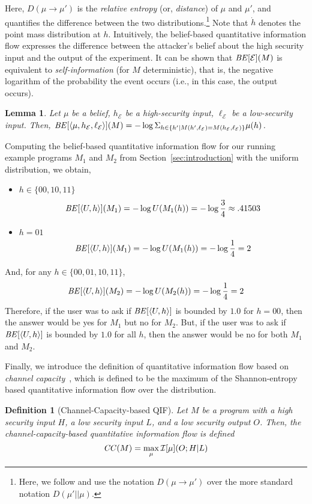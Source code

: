 \documentclass{llncs}
\newtheorem{definition}[theorem]{Definition}
\newtheorem{lemma}[theorem]{Lemma}
\newcommand{\aset}[1]{\{{#1}\}}
\newcommand{\aseq}[1]{\langle#1\rangle}
\begin{document}
Here, $D(\mu \rightarrow \mu')$ is the {\em relative entropy}
  (or, {\em distance}) of $\mu$ and $\mu'$, and quantifies the
difference between the two distributions.\footnote{Here, we
    follow \cite{clarkson:csf2005} and use the notation
    $D(\mu\rightarrow \mu')$ over the more standard notation $D(\mu'
    || \mu)$.}  Note that $\dot{h}$ denotes the point mass
distribution at $h$.  Intuitively, the belief-based quantitative
information flow expresses the difference between the attacker's
belief about the high security input and the output of the experiment.
It can be shown that ${\it BE}[\mathcal{E}](M)$ is equivalent to {\em
  self-information} (for $M$ deterministic), that is, the
  negative logarithm of the probability the event occurs (i.e., in
  this case, the output occurs).
\begin{lemma}
  Let $\mu$ be a belief, $h_\mathcal{E}$ be a high-security input,
  $\ell_\mathcal{E}$ be a low-security input.  Then, ${\it
    BE}[\langle
    \mu,h_\mathcal{E},\ell_\mathcal{E}\rangle](M)=-\log\Sigma_{h\in
    \aset{h'\mid
      M(h',\ell_\mathcal{E})=M(h_\mathcal{E},\ell_\mathcal{E})}}
  \mu(h)$.
\label{lem:be}
\end{lemma}

Computing the belief-based quantitative information flow for our
running example programs $M_1$ and $M_2$ from
Section~\ref{sec:introduction} with the uniform distribution, we
obtain,
\begin{itemize}
\item $h\in\aset{00,10,11}$
\[
  {\it BE}[\langle U,h\rangle](M_1)=-\log U(M_1(h))=-\log\frac{3}{4}\approx.41503
\]

\item $h=01$
\[
  {\it BE}[\langle U,h\rangle](M_1)=-\log U(M_1(h))=-\log\frac{1}{4}=2
\]
\end{itemize}
And, for any $h\in\aset{00,01,10,11}$,
\[
  {\it BE}[\langle U,h\rangle](M_2)=-\log U(M_2(h))=-\log\frac{1}{4}=2
\]
Therefore, if the user was to ask if ${\it BE}[\aseq{U,h}]$ is bounded
by $1.0$ for $h = 00$, then the answer would be yes for $M_1$ but no
for $M_2$.  But, if the user was to ask if ${\it BE}[\aseq{U,h}]$ is
bounded by $1.0$ for all $h$, then the answer would be no for both
$M_1$ and $M_2$.

Finally, we introduce the definition of quantitative information flow
based on {\em channel
  capacity}~\cite{mccamant:pldi2008,malacaria08,NMS2009}, which is
defined to be the maximum of the Shannon-entropy based quantitative
information flow over the distribution.
\begin{definition}[Channel-Capacity-based QIF]
Let $M$ be a program with a high security input $H$, a low security input
$L$, and a low security output $O$.  Then, the channel-capacity-based
quantitative information flow is defined
\[
{\it CC}(M)=\max_\mu\mathcal{I}[\mu](O;H|L)
\]
\end{definition}
\end{document}
